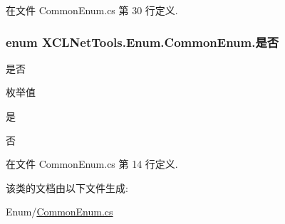 在文件 Common\-Enum.\-cs 第 30 行定义.

\hypertarget{class_x_c_l_net_tools_1_1_enum_1_1_common_enum_a5940e298dc09411c8a238f4f4e94e633}{
\subsubsection[{是否}]{\setlength{\rightskip}{0pt plus 5cm}enum {\bf X\-C\-L\-Net\-Tools.\-Enum.\-Common\-Enum.\-是否}}}\label{class_x_c_l_net_tools_1_1_enum_1_1_common_enum_a5940e298dc09411c8a238f4f4e94e633}


是否 

\begin{Desc}
\item[枚举值]\par
\begin{description}
\item[{\em 
\hypertarget{class_x_c_l_net_tools_1_1_enum_1_1_common_enum_a5940e298dc09411c8a238f4f4e94e633a0a60ac8f02ccd2cf723f927284877851}{是}\label{class_x_c_l_net_tools_1_1_enum_1_1_common_enum_a5940e298dc09411c8a238f4f4e94e633a0a60ac8f02ccd2cf723f927284877851}
}]是 \item[{\em 
\hypertarget{class_x_c_l_net_tools_1_1_enum_1_1_common_enum_a5940e298dc09411c8a238f4f4e94e633ac9744f45e76d885ae1c74d4f4a934b2e}{否}\label{class_x_c_l_net_tools_1_1_enum_1_1_common_enum_a5940e298dc09411c8a238f4f4e94e633ac9744f45e76d885ae1c74d4f4a934b2e}
}]否 \end{description}
\end{Desc}


在文件 Common\-Enum.\-cs 第 14 行定义.



该类的文档由以下文件生成\-:\begin{DoxyCompactItemize}
\item 
Enum/\hyperlink{_common_enum_8cs}{Common\-Enum.\-cs}\end{DoxyCompactItemize}
